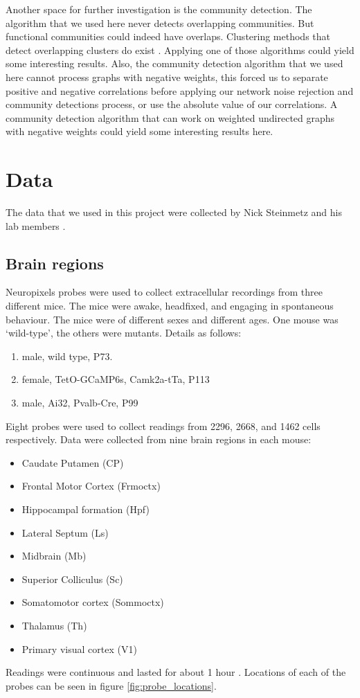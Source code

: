 Another space for further investigation is the community detection. The algorithm that we used here never detects overlapping communities. But functional communities could indeed have overlaps. Clustering methods that detect overlapping clusters do exist \parencite{baadel}. Applying one of those algorithms could yield some interesting results. Also, the community detection algorithm that we used here cannot process graphs with negative weights, this forced us to separate positive and negative correlations before applying our network noise rejection and community detections process, or use the absolute value of our correlations. A community detection algorithm that can work on weighted undirected graphs with negative weights could yield some interesting results here.

\section{Data}

    The data that we used in this project were collected by Nick Steinmetz and his lab members \parencite{stringer}.

    \subsection{Brain regions}
    Neuropixels probes were used to collect extracellular recordings  \parencite{jun} from three different mice. The mice were awake, headfixed, and engaging in spontaneous behaviour. The mice were of different sexes and different ages. One mouse was `wild-type', the others were mutants. Details as follows:
    \begin{enumerate}
        \item male, wild type, P73. %
        \item female, TetO-GCaMP6s, Camk2a-tTa, P113 %
        \item male, Ai32, Pvalb-Cre, P99 %
    \end{enumerate}

    Eight probes were used to collect readings from 2296, 2668, and 1462 cells respectively. Data were collected from nine brain regions in each mouse:
    \begin{itemize}
        \item Caudate Putamen (CP)
        \item Frontal Motor Cortex (Frmoctx)
        \item Hippocampal formation (Hpf)
        \item Lateral Septum (Ls)
        \item Midbrain (Mb)
        \item Superior Colliculus (Sc)
        \item Somatomotor cortex (Sommoctx)
        \item Thalamus (Th)
        \item Primary visual cortex (V1)
    \end{itemize}
    Readings were continuous and lasted for about 1 hour  \parencite{stringer}. Locations of each of the probes can be seen in figure \ref{fig:probe_locations}.

